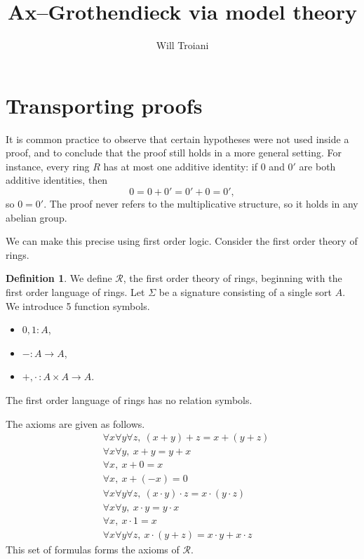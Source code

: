\documentclass[12pt]{article}
\title{Ax--Grothendieck via model theory}
\author{Will Troiani}
\theoremstyle{plain}
\theoremstyle{definition}
\newtheorem{defn}[thm]{Definition}
\newcommand{\call}[1]{\mathcal{#1}}
\newcommand{\lto}{\longrightarrow}
\begin{document}
\maketitle

\section{Transporting proofs}

It is common practice to observe that certain hypotheses were not used inside a proof, and to conclude that the proof still holds in a more general setting. For instance, every ring $R$ has at most one additive identity: if $0$ and $0'$ are both additive identities, then
\[
0 = 0 + 0' = 0' + 0 = 0',
\]
so $0 = 0'$. The proof never refers to the multiplicative structure, so it holds in any abelian group.

We can make this precise using first order logic. Consider the first order theory of rings.

\begin{defn}\label{def:FoT_rings}
We define $\call{R}$, the first order theory of rings, beginning with the first order language of rings. Let $\Sigma$ be a signature consisting of a single sort $A$. We introduce 5 function symbols.
\begin{itemize}
\item $0,1: A$,
\item $-: A \lto A$,
\item $+, \cdot\,: A \times A \lto A$.
\end{itemize}
The first order language of rings has no relation symbols.

The axioms are given as follows.
\begin{align}
&\forall x\forall y\forall z,\ (x+y)+z = x+(y+z)\\
&\forall x\forall y,\ x+y = y+x\\
&\forall x,\ x+0 = x\\
&\forall x,\ x+(-x) = 0\\
&\forall x\forall y\forall z,\ (x\cdot y)\cdot z = x\cdot (y\cdot z)\\
&\forall x\forall y,\ x\cdot y = y\cdot x\\
&\forall x,\ x\cdot 1 = x\\
&\forall x\forall y\forall z,\ x\cdot (y+z) = x\cdot y + x\cdot z
\end{align}
This set of formulas forms the axioms of $\call{R}$.
\end{defn}
\end{document}
